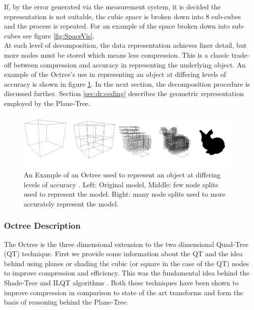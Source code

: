 If, by the error generated via the measurement system, it is decided the representation is not suitable, the cubic space is broken down into 8 sub-cubes and the process is repeated. For an example of the space broken down into sub-cubes see figure \ref{fig:SpaceVis}. \\

At each level of decomposition, the data representation achieves finer detail, but more nodes must be stored which means less compression. This is a classic trade-off between compression and accuracy in representing the underlying object. An example of the Octree's use in representing an object at differing levels of accuracy is shown in figure \ref{fig:octreeaccuracy}. In the next section, the decomposition procedure is discussed further. Section \ref{sec:dr:coding} describes the geometric representation employed by the Plane-Tree.


\begin{figure}[!htb]
\centering
\includegraphics[width=14cm]{images/ch2/OctreeExample}
\caption{An Example of an Octree used to represent an object at differing levels of accuracy \cite{Hornung13Octomap}. Left: Original model, Middle: few node splits used to represent the model. Right: many node splits used to more accurately represent the model.}
\label{fig:octreeaccuracy}
\end{figure}


\subsubsection{Octree Description}
\label{OTDesc}

The Octree is the three dimensional extension to the two dimensional Quad-Tree (QT) technique. First we provide some information about the QT and the idea behind using planes or shading the cubic (or square in the case of the QT) nodes to improve compression and efficiency. This was the fundamental idea behind the Shade-Tree and ILQT algorithms \cite{Gonzalez07ShadeTree, Lincoln13Interpolating}. Both these techniques have been shown to improve compression in comparison to state of the art transforms and form the basis of reasoning behind the Plane-Tree. \\

